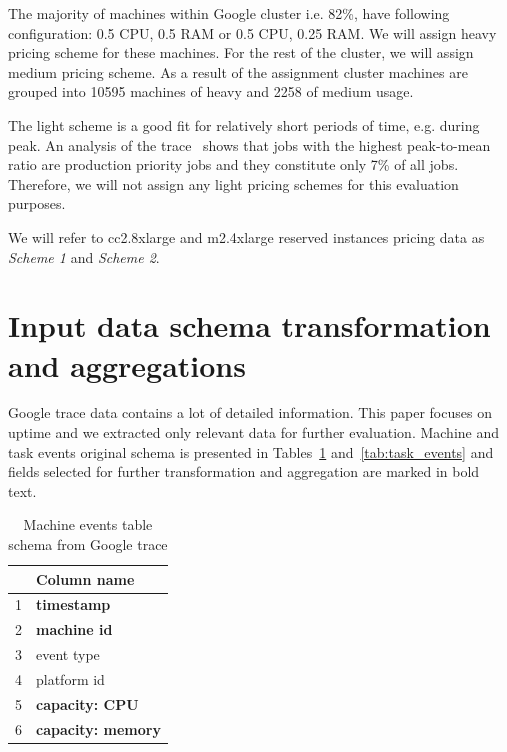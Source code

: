 \documentclass[]{final_report}
\begin{document}
The majority of machines within Google cluster i.e. 82\%, have following configuration: 0.5 CPU, 0.5 RAM or 0.5 CPU, 0.25 RAM. We will assign heavy pricing scheme for these machines. For the rest of the cluster, we will assign medium pricing scheme. 
As a result of the assignment cluster machines are grouped into 10595 machines of heavy and 2258 of medium usage.

The light scheme is a good fit for relatively short periods of time, e.g. during peak. An analysis of the trace~\cite{clusterdata:Reiss2012b} shows that jobs with the highest peak-to-mean ratio are production priority jobs and they constitute only 7\% of all jobs. Therefore, we will not assign any light pricing schemes for this evaluation purposes. 

We will refer to cc2.8xlarge and m2.4xlarge reserved instances pricing data as \textit{Scheme 1} and \textit{Scheme 2}.  
 

\section{Input data schema transformation and aggregations}

Google trace data contains a lot of detailed information. This paper focuses on uptime and we extracted only relevant data for further evaluation. Machine and task events original schema is presented in Tables~\ref{tab:machine_events} and~\ref{tab:task_events} and fields selected for further transformation and aggregation are marked in bold text. 

\begin{table}[h]
\begin{center}
    \begin{tabular}{| l | l |}
    \hline
    & \textbf{Column name} \\
    \hline
    1 & \textbf{timestamp}\\
    \hline
    2 & \textbf{machine id} \\
     \hline
    3 & event type\\
     \hline
    4 & platform id\\
     \hline
    5 & \textbf{capacity: CPU}\\
     \hline
    6 & \textbf{capacity: memory}\\
    \hline
    \end{tabular}
\end{center}
\caption{Machine events table schema from Google trace}
\label{tab:machine_events}
\end{table}
\end{document}

